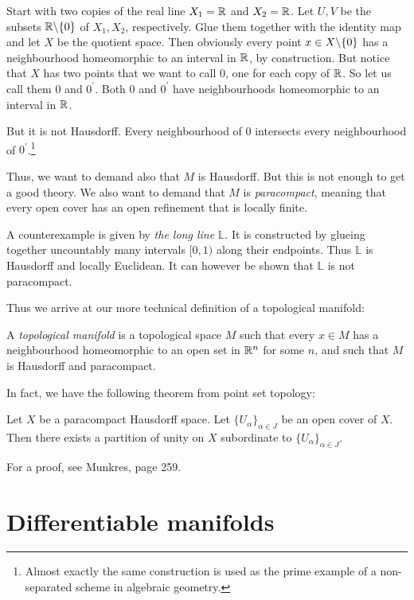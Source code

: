 \documentclass[11pt, english]{article}
\begin{document}
\begin{example}
Start with two copies of the real line $X_1=\mathbb{R}$ and $X_2=\mathbb{R}$. Let $U,V$ be the subsets $\mathbb{R} \backslash \{ 0\}$ of $X_1,X_2$, respectively. Glue them together with the identity map and let $X$ be the quotient space. Then obviously every point $x \in X \backslash \{ 0\}$ has a neighbourhood homeomorphic to an interval in $\mathbb{R}$, by construction. But notice that $X$ has two points that we want to call $0$, one for each copy of $\mathbb{R}$. So let us call them $0$ and $0^\prime$. Both $0$ and $0^\prime$ have neighbourhoods homeomorphic to an interval in $\mathbb{R}$.

But it is not Hausdorff. Every neighbourhood of $0$ intersects every neighbourhood of $0^\prime$.\footnote{Almost exactly the same construction is used as the prime example of a non-separated scheme in algebraic geometry.} 
\end{example}

Thus, we want to demand also that $M$ is Hausdorff. But this is not enough to get a good theory. We also want to demand that $M$ is \emph{paracompact}, meaning that every open cover has an open refinement that is locally finite.

A counterexample is given by \emph{the long line} $\mathbb L$. It is constructed by glueing together uncountably many intervals $[0,1)$ along their endpoints. Thus $\mathbb L$ is Hausdorff and locally Euclidean. It can however be shown that $\mathbb L$ is not paracompact.

Thus we arrive at our more technical definition of a topological manifold:
\begin{defi}
 A \emph{topological manifold} is a topological space $M$ such that every $x \in M$ has a neighbourhood homeomorphic to an open set in $\mathbb{R}^n$ for some $n$, and such that $M$ is Hausdorff and paracompact.
\end{defi}

In fact, we have the following theorem from point set topology:
\begin{thm}
 Let $X$ be a paracompact Hausdorff space. Let $\{ U_\alpha\}_{\alpha \in J}$ be an open cover of $X$. Then there exists a partition of unity on $X$ subordinate to $\{ U_\alpha\}_{\alpha \in J}$. 
\end{thm}
For a proof, see Munkres, page 259. 


\newpage
\section{Differentiable manifolds}
\end{document}
